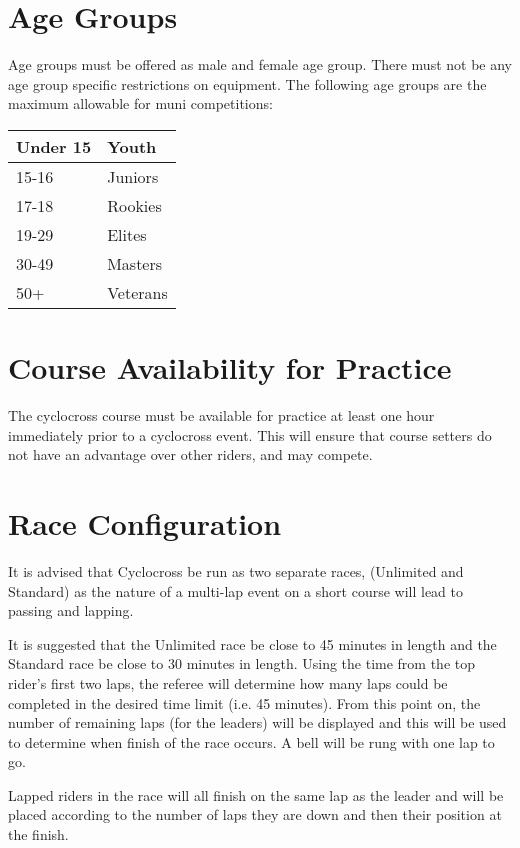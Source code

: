 \section{Age Groups}

Age groups must be offered as male and female age group.
There must not be any age group specific restrictions on equipment.
The following age groups are the maximum allowable for muni competitions:

\begin{tabular}{|l|l|}
\hline
Under 15 & Youth \\
\hline
15-16 & Juniors \\
\hline
17-18 & Rookies \\
\hline
19-29 & Elites \\
\hline
30-49 & Masters \\
\hline
50+ & Veterans \\
\hline
\end{tabular}

\section{Course Availability for Practice}

The cyclocross course must be available for practice at least one hour immediately prior to a cyclocross event.
This will ensure that course setters do not have an advantage over other riders, and may compete.

\section{Race Configuration}

It is advised that Cyclocross be run as two separate races, (Unlimited and Standard) as the nature of a multi-lap event on a short course will lead to passing and lapping.

It is suggested that the Unlimited race be close to 45 minutes in length and the Standard race be close to 30 minutes in length.
Using the time from the top rider's first two laps, the referee will determine how many laps could be completed in the desired time limit (i.e. 45 minutes).
From this point on, the number of remaining laps (for the leaders) will be displayed and this will be used to determine when finish of the race occurs.
A bell will be rung with one lap to go.

Lapped riders in the race will all finish on the same lap as the leader and will be placed according to the number of laps they are down and then their position at the finish.
